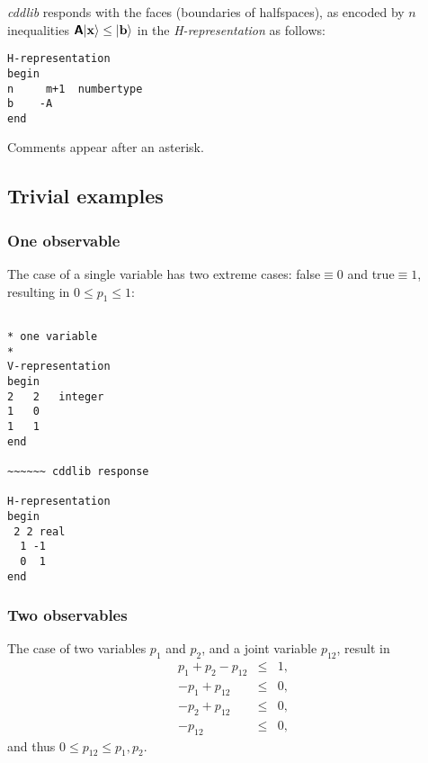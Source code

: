\documentclass[%
  twocolumn,
 showpacs,
 showkeys,
 preprintnumbers,
 amsmath,amssymb,
 aps,
  pra,
  longbibliography,
 floatfix,
 ]{revtex4-1}
\begin{document}

{\em cddlib} responds with the faces (boundaries of halfspaces), as encoded by  $n$  inequalities $ \textsf{\textbf{A}} \vert {\bf x} \rangle   \le \vert {\bf b} \rangle $
in the  {\em H-representation} as follows:

{\begin{lstlisting}[backgroundcolor=\color{yellow!10},framerule=0pt,breaklines=true, frame=tb]
H-representation
begin
n     m+1  numbertype
b    -A
end
\end{lstlisting}  }

Comments appear after an asterisk.


\subsection{Trivial examples}
\label{2017-b-teap}


\subsubsection{One observable}
\label{2017-b-ooa}


The case of a single variable has two extreme cases: false$\equiv 0$ and true$\equiv 1$,
resulting in $0\le p_1 \le 1$:

{ \begin{lstlisting}[backgroundcolor=\color{yellow!10},framerule=0pt,breaklines=true, frame=tb]

* one variable
*
V-representation
begin
2   2   integer
1   0
1   1
end

~~~~~~ cddlib response

H-representation
begin
 2 2 real
  1 -1
  0  1
end

\end{lstlisting}  }

\subsubsection{Two observables}
\label{2017-b-toa}

The case of two variables $p_1$ and $p_2$, and a joint variable $p_{12}$,
result in
\begin{eqnarray}
p_1 + p_2 - p_{12} &\le& 1,
\\
- p_1 + p_{12} &\le& 0,
\\
- p_2 + p_{12} &\le& 0,
\\
- p_{12} &\le& 0,
\label{2017-b-1-2-p-ca}
\end{eqnarray}
and thus $0  \le  p_{12}  \le  p_1 , p_2$.
\end{document}

